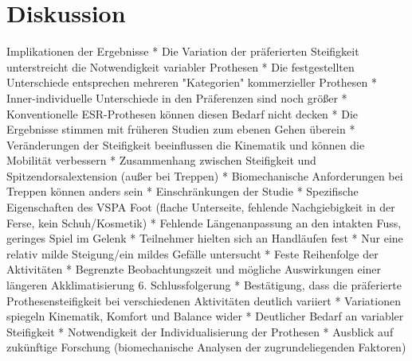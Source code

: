 \documentclass{SeminarV2}
\begin{document}
\section{Diskussion}
Implikationen der Ergebnisse *   Die Variation der präferierten Steifigkeit unterstreicht die Notwendigkeit variabler Prothesen *   Die festgestellten Unterschiede entsprechen mehreren "Kategorien" kommerzieller Prothesen *   Inner-individuelle Unterschiede in den Präferenzen sind noch größer *   Konventionelle ESR-Prothesen können diesen Bedarf nicht decken *   Die Ergebnisse stimmen mit früheren Studien zum ebenen Gehen überein *   Veränderungen der Steifigkeit beeinflussen die Kinematik und können die Mobilität verbessern *   Zusammenhang zwischen Steifigkeit und Spitzendorsalextension (außer bei Treppen) *   Biomechanische Anforderungen bei Treppen können anders sein *   Einschränkungen der Studie *   Spezifische Eigenschaften des VSPA Foot (flache Unterseite, fehlende Nachgiebigkeit in der Ferse, kein Schuh/Kosmetik) *   Fehlende Längenanpassung an den intakten Fuss, geringes Spiel im Gelenk *   Teilnehmer hielten sich an Handläufen fest *   Nur eine relativ milde Steigung/ein mildes Gefälle untersucht *   Feste Reihenfolge der Aktivitäten *   Begrenzte Beobachtungszeit und mögliche Auswirkungen einer längeren Akklimatisierung
6. Schlussfolgerung *   Bestätigung, dass die präferierte Prothesensteifigkeit bei verschiedenen Aktivitäten deutlich variiert *   Variationen spiegeln Kinematik, Komfort und Balance wider *   Deutlicher Bedarf an variabler Steifigkeit *   Notwendigkeit der Individualisierung der Prothesen *   Ausblick auf zukünftige Forschung (biomechanische Analysen der zugrundeliegenden Faktoren)
\end{document}
